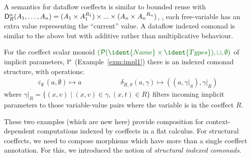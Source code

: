 \begin{remark}
A semantics for dataflow coeffects is similar to bounded reuse with
$\mathsf{D}^n_R (A_1, \ldots, A_n) = (A_1 \times A_1^{R_1}) \times ... \times (A_n \times {A_n}^{R_n})$, \ie{},
each free-variable has an extra value representing the ``current'' value. A dataflow indexed
comonad is similar to the above but with additive rather than multiplicative behaviour. 
\end{remark}

\begin{example}
For the coeffect scalar monoid $\cclrd{(\mathcal{P}(\ident{Name} \times \ident{Types}), \cup, \emptyset{})}$ 
of implicit parameters, 
$\mathsf{I}^\ast$ (Example~\ref{exm:impl1}) there is an indexed comonad structure, with operations: 
%
\begin{align*}
\varepsilon_{\emptyset} \, (a, \emptyset{}) \mapsto a 
\qquad\qquad\quad~~~
\delta_{R,S} (a, \gamma) \mapsto ((a, {\gamma|}_S ), {\gamma|}_R) %
\end{align*}
where ${\gamma|}_R = \{(x, v) \mid (x, v) \in \gamma, (x, t) \in R \}$ filters incoming implicit parameters to those
variable-value pairs where the variable is in the coeffect $R$.
\label{exm:impl2}
\end{example}

\indent
These two examples (which are new here) provide composition for context-dependent
computations indexed by coeffects in a flat calculus. For structural coeffects,
we need to compose morphisms which have more than a single coeffect annotation. For this, we
introduced the notion of \emph{structural indexed comonads}. 

